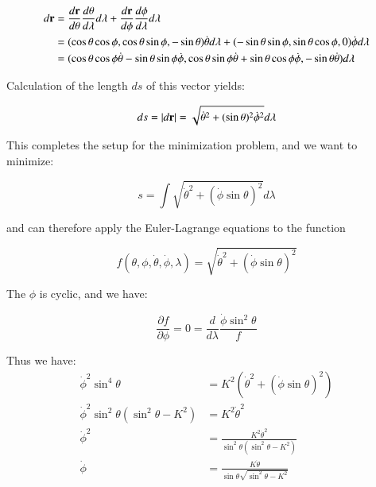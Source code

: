 \documentclass{article}
\newcommand{\Abs}[1]{\left\lvert{#1}\right\rvert}
\newcommand{\dottheta}[0]{\dot{\theta}}
\newcommand{\dotphi}[0]{\dot{\phi}}
\newcommand{\PD}[2]{\frac{\partial {#2}}{\partial {#1}}}
\begin{document}
\begin{align*}
d \Br 
&= \frac{d\Br}{d \theta} \frac{d \theta}{d \lambda} d \lambda + \frac{d\Br}{d \phi} \frac{d \phi}{d \lambda} d \lambda \\
&=
 ( \cos\theta \cos\phi, \cos\theta \sin\phi, -\sin\theta) \dottheta d\lambda
+( -\sin\theta \sin\phi, \sin\theta \cos\phi, 0) \dotphi d\lambda \\
&=
 ( \cos\theta \cos\phi \dottheta - \sin\theta \sin\phi \dotphi,
   \cos\theta \sin\phi \dottheta + \sin\theta \cos\phi \dotphi,
  -\sin\theta \dottheta) d\lambda
\end{align*}

Calculation of the length $ds$ of this vector yields:

\begin{equation*}
ds = \Abs{ d\Br} = \sqrt{\dottheta^2 + (\sin\theta)^2 \dotphi^2} d\lambda
\end{equation*}

This completes the setup for the minimization problem, and we want to 
minimize:

\begin{equation*}
s = \int \sqrt{\dottheta^2 + ( \dotphi \sin\theta )^2 } d\lambda
\end{equation*}

and can therefore apply the Euler-Lagrange equations to the function

\begin{equation*}
f(\theta, \phi, \dottheta, \dotphi, \lambda) = 
\sqrt{\dottheta^2 + ( \dotphi \sin\theta )^2 }
\end{equation*}

The $\phi$ is cyclic, and we have:

\begin{equation*}
\PD{\phi}{f} = 0 = \frac{d}{d\lambda} \frac{\dotphi \sin^2\theta}{f}
\end{equation*}

Thus we have:
\begin{align*}
\dotphi^2 \sin^4\theta &= K^2 \left(\dottheta^2 + ( \dotphi \sin\theta )^2 \right) \\
\dotphi^2 \sin^2\theta( \sin^2\theta - K^2 ) &= K^2 \dottheta^2 \\
\dotphi^2 
&= \frac{K^2 \dottheta^2 }{ \sin^2\theta ( \sin^2\theta - K^2 ) } \\
\dotphi
&= \frac{K \dottheta }{ \sin\theta \sqrt{ \sin^2\theta - K^2 } } \\
\end{align*}
\end{document}
